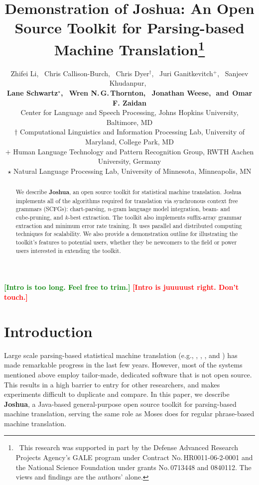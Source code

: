\documentclass[11pt]{article}
\title{Demonstration of Joshua: An Open Source Toolkit for Parsing-based Machine Translation\thanks{$\;\:$This
research was supported in part by the Defense Advanced Research Projects Agency's GALE program under
Contract No.\,HR0011-06-2-0001 and the National Science Foundation under grants No.\,0713448 and 0840112. The
views and findings are the authors' alone.}}
\author{
Zhifei Li,\,\,\,
Chris Callison-Burch,\,\,\, %
Chris Dyer$^\dagger$,\,\,\,
Juri Ganitkevitch$^+$,\,\,\,
Sanjeev Khudanpur,\,\,\, \\
{\bf Lane Schwartz$^\star$,\,\,\,
Wren N.\,G.\,Thornton,\,\,\,
Jonathan Weese,\,\,
{\textnormal{and}}\,\,\,Omar F. Zaidan}\\
Center for Language and Speech Processing, Johns Hopkins University, Baltimore, MD\\
$\dagger$ Computational Linguistics and Information Processing Lab, University of Maryland, College Park, MD\\
$+$ Human Language Technology and Pattern Recognition Group, RWTH Aachen University, Germany\\
$\star$ Natural Language Processing Lab, University of Minnesota, Minneapolis, MN }
\date{}
\newcommand{\Trim}[1]{{\large\textcolor{green}{\textbf{[#1]}}}}
\newcommand{\Keep}[1]{{\large\textcolor{red}{\textbf{[#1]}}}}
\begin{document}
\maketitle


\begin{abstract}

We describe \textbf{Joshua}, an open source toolkit for statistical machine
translation.  Joshua implements all of the algorithms required for translation
via synchronous context free grammars (SCFGs): chart-parsing, $n$-gram language
model integration, beam- and cube-pruning, and $k$-best extraction.  The toolkit
also implements suffix-array grammar extraction and minimum error rate training.
It uses parallel and distributed computing techniques for scalability.  We also
provide a demonstration outline for illustrating the toolkit's features to
potential users, whether they be newcomers to the field or power users interested
in extending the toolkit.

\end{abstract}

\Trim{Intro is too long. Feel free to trim.}
\Keep{Intro is juuuuust right. Don't touch.}
\section{Introduction}

Large scale parsing-based statistical machine translation (e.g., ,
, , and ) has made
remarkable progress in the last few years.  However, most of the systems mentioned
above employ tailor-made, dedicated software that is not open source.  This results
in a high barrier to entry for other researchers, and makes experiments difficult to
duplicate and compare.  In this paper, we describe \textbf{Joshua}, a Java-based
general-purpose open source toolkit for parsing-based machine translation, serving the
same role as Moses \cite{Moses} does for regular phrase-based machine translation.

\end{document}
